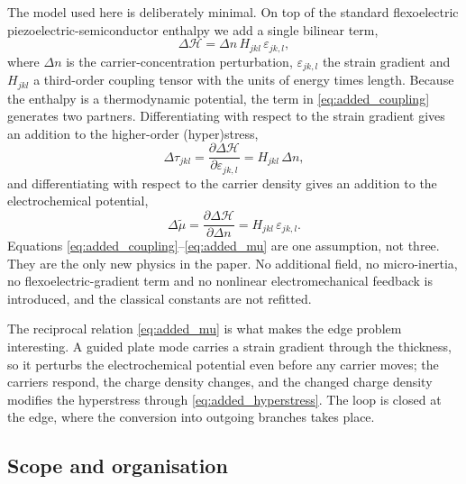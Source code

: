 The model used here is deliberately minimal.  On top of the standard
flexoelectric piezoelectric-semiconductor enthalpy we add a single bilinear
term,
\begin{equation}
\label{eq:added_coupling}
\Delta\mathcal{H}=\Delta n\,H_{jkl}\,\varepsilon_{jk,l},
\end{equation}
where $\Delta n$ is the carrier-concentration perturbation, $\varepsilon_{jk,l}$
the strain gradient and $H_{jkl}$ a third-order coupling tensor with the units
of energy times length.  Because the enthalpy is a thermodynamic potential, the
term in \cref{eq:added_coupling} generates two partners.  Differentiating with
respect to the strain gradient gives an addition to the higher-order
(hyper)stress,
\begin{equation}
\label{eq:added_hyperstress}
\Delta\tau_{jkl}=\frac{\partial\Delta\mathcal{H}}{\partial\varepsilon_{jk,l}}
=H_{jkl}\,\Delta n,
\end{equation}
and differentiating with respect to the carrier density gives an addition to the
electrochemical potential,
\begin{equation}
\label{eq:added_mu}
\Delta\widetilde\mu=\frac{\partial\Delta\mathcal{H}}{\partial\Delta n}
=H_{jkl}\,\varepsilon_{jk,l}.
\end{equation}
Equations \eqref{eq:added_coupling}--\eqref{eq:added_mu} are one assumption,
not three.  They are the only new physics in the paper.  No additional field,
no micro-inertia, no flexoelectric-gradient term and no nonlinear
electromechanical feedback is introduced, and the classical constants are not
refitted.

The reciprocal relation \eqref{eq:added_mu} is what makes the edge problem
interesting.  A guided plate mode carries a strain gradient through the
thickness, so it perturbs the electrochemical potential even before any carrier
moves; the carriers respond, the charge density changes, and the changed charge
density modifies the hyperstress through \eqref{eq:added_hyperstress}.  The loop
is closed at the edge, where the conversion into outgoing branches takes place.

\subsection{Scope and organisation}
\label{sec:intro_scope}

